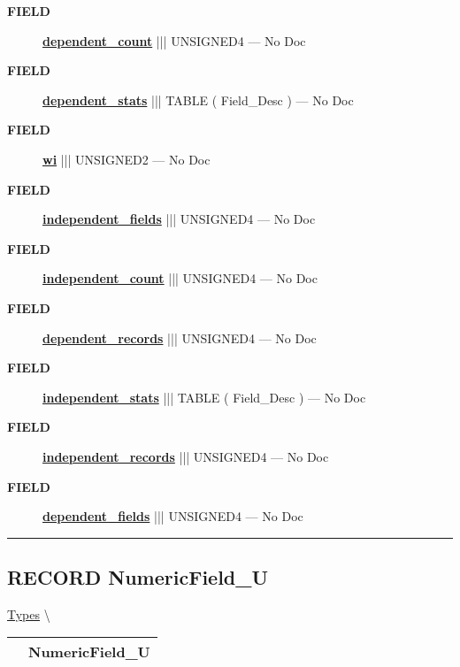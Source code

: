 \par
\begin{description}
\item [\colorbox{tagtype}{\color{white} \textbf{\textsf{FIELD}}}] \textbf{\underline{dependent\_count}} ||| UNSIGNED4 --- No Doc
\item [\colorbox{tagtype}{\color{white} \textbf{\textsf{FIELD}}}] \textbf{\underline{dependent\_stats}} ||| TABLE ( Field\_Desc ) --- No Doc
\item [\colorbox{tagtype}{\color{white} \textbf{\textsf{FIELD}}}] \textbf{\underline{wi}} ||| UNSIGNED2 --- No Doc
\item [\colorbox{tagtype}{\color{white} \textbf{\textsf{FIELD}}}] \textbf{\underline{independent\_fields}} ||| UNSIGNED4 --- No Doc
\item [\colorbox{tagtype}{\color{white} \textbf{\textsf{FIELD}}}] \textbf{\underline{independent\_count}} ||| UNSIGNED4 --- No Doc
\item [\colorbox{tagtype}{\color{white} \textbf{\textsf{FIELD}}}] \textbf{\underline{dependent\_records}} ||| UNSIGNED4 --- No Doc
\item [\colorbox{tagtype}{\color{white} \textbf{\textsf{FIELD}}}] \textbf{\underline{independent\_stats}} ||| TABLE ( Field\_Desc ) --- No Doc
\item [\colorbox{tagtype}{\color{white} \textbf{\textsf{FIELD}}}] \textbf{\underline{independent\_records}} ||| UNSIGNED4 --- No Doc
\item [\colorbox{tagtype}{\color{white} \textbf{\textsf{FIELD}}}] \textbf{\underline{dependent\_fields}} ||| UNSIGNED4 --- No Doc
\end{description}





\rule{\linewidth}{0.5pt}
\subsection*{\textsf{\colorbox{headtoc}{\color{white} RECORD}
NumericField\_U}}

\hypertarget{ecldoc:logisticregression.types.numericfield_u}{}
\hspace{0pt} \hyperlink{ecldoc:LogisticRegression.Types}{Types} \textbackslash 

{\renewcommand{\arraystretch}{1.5}
\begin{tabularx}{\textwidth}{|>{\raggedright\arraybackslash}l|X|}
\hline
\hspace{0pt}\mytexttt{\color{red} } & \textbf{NumericField\_U} \\
\hline
\end{tabularx}
}

